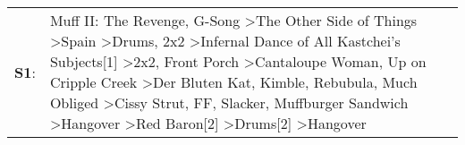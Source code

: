 \begin{supertabular}{p{0.03\textwidth}p{0.92\textwidth}}
 \textbf{S1}:  &  Muff II: The Revenge\textsuperscript{}, \enspace G-Song\textsuperscript{} \textgreater \enspace The Other Side of Things\textsuperscript{} \textgreater \enspace Spain\textsuperscript{} \textgreater \enspace Drums\textsuperscript{}, \enspace 2x2\textsuperscript{} \textgreater \enspace Infernal Dance of All Kastchei's Subjects[1]\textsuperscript{} \textgreater \enspace 2x2\textsuperscript{}, \enspace Front Porch\textsuperscript{} \textgreater \enspace Cantaloupe Woman\textsuperscript{}, \enspace Up on Cripple Creek\textsuperscript{} \textgreater \enspace Der Bluten Kat\textsuperscript{}, \enspace Kimble\textsuperscript{}, \enspace Rebubula\textsuperscript{}, \enspace Much Obliged\textsuperscript{} \textgreater \enspace Cissy Strut\textsuperscript{}, \enspace FF\textsuperscript{}, \enspace Slacker\textsuperscript{}, \enspace Muffburger Sandwich\textsuperscript{} \textgreater \enspace Hangover\textsuperscript{} \textgreater \enspace Red Baron[2]\textsuperscript{} \textgreater \enspace Drums[2]\textsuperscript{} \textgreater \enspace Hangover\textsuperscript{}  \enspace  \\
\end{supertabular}
